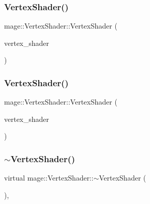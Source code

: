\hypertarget{classmage_1_1_vertex_shader_a713f8581278ea2e5eb3010207b7e42a8}{}\label{classmage_1_1_vertex_shader_a713f8581278ea2e5eb3010207b7e42a8} 
\subsubsection{\texorpdfstring{Vertex\+Shader()}{VertexShader()}\hspace{0.1cm}{\footnotesize\ttfamily [3/4]}}
{\footnotesize\ttfamily mage\+::\+Vertex\+Shader\+::\+Vertex\+Shader (\begin{DoxyParamCaption}\item[{const \hyperlink{classmage_1_1_vertex_shader}{Vertex\+Shader} \&}]{vertex\+\_\+shader }\end{DoxyParamCaption})\hspace{0.3cm}{\ttfamily [delete]}}

\hypertarget{classmage_1_1_vertex_shader_a07437a9371fa85f2e24e6713f6192d63}{}\label{classmage_1_1_vertex_shader_a07437a9371fa85f2e24e6713f6192d63} 
\subsubsection{\texorpdfstring{Vertex\+Shader()}{VertexShader()}\hspace{0.1cm}{\footnotesize\ttfamily [4/4]}}
{\footnotesize\ttfamily mage\+::\+Vertex\+Shader\+::\+Vertex\+Shader (\begin{DoxyParamCaption}\item[{\hyperlink{classmage_1_1_vertex_shader}{Vertex\+Shader} \&\&}]{vertex\+\_\+shader }\end{DoxyParamCaption})\hspace{0.3cm}{\ttfamily [default]}}

\hypertarget{classmage_1_1_vertex_shader_a83e5bd464361b7f94f969475f1eeaf2a}{}\label{classmage_1_1_vertex_shader_a83e5bd464361b7f94f969475f1eeaf2a} 
\subsubsection{\texorpdfstring{$\sim$\+Vertex\+Shader()}{~VertexShader()}}
{\footnotesize\ttfamily virtual mage\+::\+Vertex\+Shader\+::$\sim$\+Vertex\+Shader (\begin{DoxyParamCaption}{ }\end{DoxyParamCaption})\hspace{0.3cm}{\ttfamily [virtual]}, {\ttfamily [default]}}



